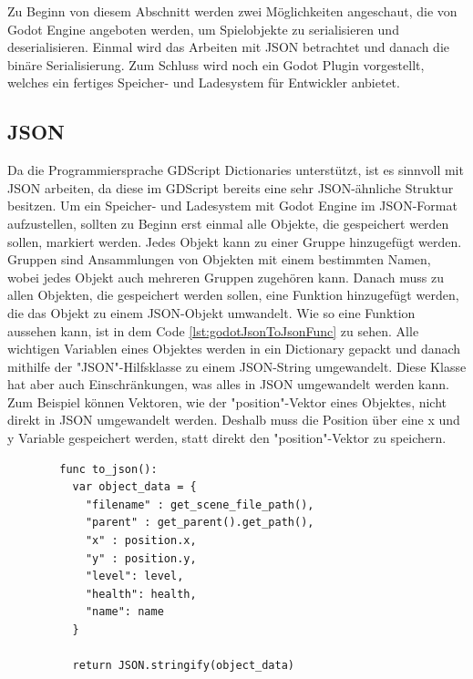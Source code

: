 Zu Beginn von diesem Abschnitt werden zwei Möglichkeiten angeschaut, die von Godot Engine angeboten werden, um Spielobjekte zu serialisieren und deserialisieren. Einmal wird das Arbeiten mit JSON betrachtet und danach die binäre Serialisierung. Zum Schluss wird noch ein Godot Plugin vorgestellt, welches ein fertiges Speicher- und Ladesystem für Entwickler anbietet. 

\subsection{JSON}
Da die Programmiersprache GDScript Dictionaries unterstützt, ist es sinnvoll mit JSON arbeiten, da diese im GDScript bereits eine sehr JSON-ähnliche Struktur besitzen. Um ein Speicher- und Ladesystem mit Godot Engine im JSON-Format aufzustellen, sollten zu Beginn erst einmal alle Objekte, die gespeichert werden sollen, markiert werden. Jedes Objekt kann zu einer Gruppe hinzugefügt werden. Gruppen sind Ansammlungen von Objekten mit einem bestimmten Namen, wobei jedes Objekt auch mehreren Gruppen zugehören kann. Danach muss zu allen Objekten, die gespeichert werden sollen, eine Funktion hinzugefügt werden, die das Objekt zu einem JSON-Objekt umwandelt. Wie so eine Funktion aussehen kann, ist in dem Code \ref{lst:godotJsonToJsonFunc} zu sehen. Alle wichtigen Variablen eines Objektes werden in ein Dictionary gepackt und danach mithilfe der "JSON"-Hilfsklasse zu einem JSON-String umgewandelt. Diese Klasse hat aber auch Einschränkungen, was alles in JSON umgewandelt werden kann. Zum Beispiel können Vektoren, wie der "position"-Vektor eines Objektes, nicht direkt in JSON umgewandelt werden. Deshalb muss die Position über eine x und y Variable gespeichert werden, statt direkt den "position"-Vektor zu speichern.\cite{godotengineSavingGames}

\begin{listing}[htp]
    \begin{verbatim}
        func to_json():
          var object_data = {
            "filename" : get_scene_file_path(),
            "parent" : get_parent().get_path(),
            "x" : position.x, 
            "y" : position.y,
            "level": level,
            "health": health,
            "name": name
          }

          return JSON.stringify(object_data)
    \end{verbatim}
    \caption{Beispiel für das Speichern mit JSON in Godot\cite{godotengineSavingGames}}
    \label{lst:godotJsonToJsonFunc}
\end{listing}

